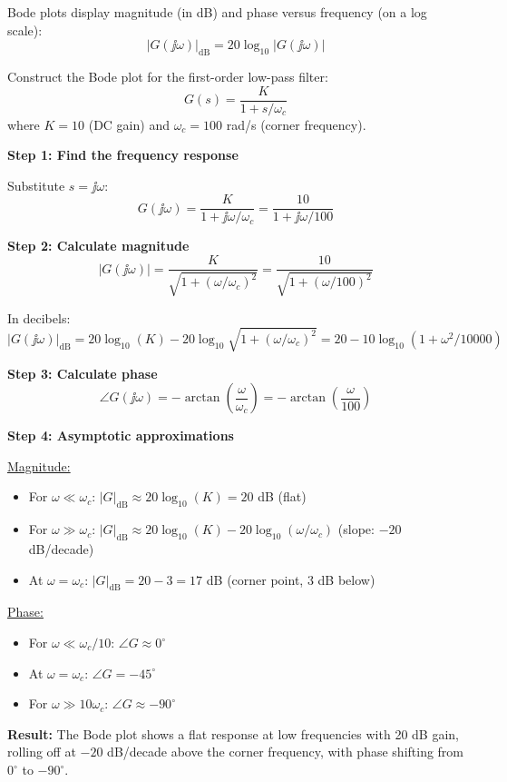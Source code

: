 Bode plots display magnitude (in dB) and phase versus frequency (on a log scale):
\begin{equation}
|G(\jj\omega)|_{\text{dB}} = 20\log_{10}|G(\jj\omega)|
\end{equation}



\begin{examplebox}[title=Example: Drawing a Bode Plot from Frequency Response]
Construct the Bode plot for the first-order low-pass filter:
\[
G(s) = \frac{K}{1 + s/\omega_c}
\]
where $K = 10$ (DC gain) and $\omega_c = 100$ rad/s (corner frequency).

\textbf{Step 1: Find the frequency response}

Substitute $s = \jj\omega$:
\[
G(\jj\omega) = \frac{K}{1 + \jj\omega/\omega_c} = \frac{10}{1 + \jj\omega/100}
\]

\textbf{Step 2: Calculate magnitude}
\[
|G(\jj\omega)| = \frac{K}{\sqrt{1 + (\omega/\omega_c)^2}} = \frac{10}{\sqrt{1 + (\omega/100)^2}}
\]

In decibels:
\[
|G(\jj\omega)|_{\text{dB}} = 20\log_{10}(K) - 20\log_{10}\sqrt{1 + (\omega/\omega_c)^2} = 20 - 10\log_{10}(1 + \omega^2/10000)
\]

\textbf{Step 3: Calculate phase}
\[
\angle G(\jj\omega) = -\arctan\left(\frac{\omega}{\omega_c}\right) = -\arctan\left(\frac{\omega}{100}\right)
\]

\textbf{Step 4: Asymptotic approximations}

\underline{Magnitude:}
\begin{itemize}
    \item For $\omega \ll \omega_c$: $|G|_{\text{dB}} \approx 20\log_{10}(K) = 20$ dB (flat)
    \item For $\omega \gg \omega_c$: $|G|_{\text{dB}} \approx 20\log_{10}(K) - 20\log_{10}(\omega/\omega_c)$ (slope: $-20$ dB/decade)
    \item At $\omega = \omega_c$: $|G|_{\text{dB}} = 20 - 3 = 17$ dB (corner point, 3 dB below)
\end{itemize}

\underline{Phase:}
\begin{itemize}
    \item For $\omega \ll \omega_c/10$: $\angle G \approx 0^{\circ}$
    \item At $\omega = \omega_c$: $\angle G = -45^{\circ}$
    \item For $\omega \gg 10\omega_c$: $\angle G \approx -90^{\circ}$
\end{itemize}

\textbf{Result:} The Bode plot shows a flat response at low frequencies with 20 dB gain, rolling off at $-20$ dB/decade above the corner frequency, with phase shifting from $0^{\circ}$ to $-90^{\circ}$.
\end{examplebox}

